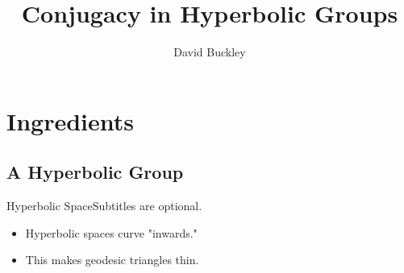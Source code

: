 \documentclass{article}
\title{Conjugacy in Hyperbolic Groups}
\author{David Buckley}
\begin{document}
\begin{frame}
  \titlepage
\end{frame}






\section{Ingredients}

\subsection{A Hyperbolic Group}

\begin{frame}{Hyperbolic Space}{Subtitles are optional.}

  \begin{itemize}
  	\item Hyperbolic spaces curve "inwards."
	\item This makes geodesic triangles thin.



  \end{itemize}

\end{frame}
\end{document}
